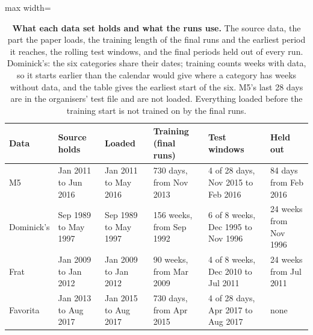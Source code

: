 \begin{table}[t]
\centering
\caption{\textbf{What each data set holds and what the runs use.} The source data, the part the paper loads, the
training length of the final runs and the earliest period it reaches, the rolling test windows, and the final periods
held out of every run. Dominick's: the six categories share their dates; training counts weeks with data, so it starts earlier than the
calendar would give where a category has weeks without data, and the table gives the earliest start of the six.
M5's last 28 days are in the organisers' test file and are not loaded. Everything loaded before the training
start is not trained on by the final runs.}
\label{tab:data-spans}
\footnotesize\setlength{\tabcolsep}{4pt}
\begin{adjustbox}{max width=\textwidth}\begin{tabular}{llllll}
\toprule
Data & Source holds & Loaded & Training (final runs) & Test windows & Held out \\
\midrule
M5 & Jan 2011 to Jun 2016 & Jan 2011 to May 2016 & 730 days, from Nov 2013 & 4 of 28 days, Nov 2015 to Feb 2016 & 84 days from Feb 2016 \\
Dominick's & Sep 1989 to May 1997 & Sep 1989 to May 1997 & 156 weeks, from Sep 1992 & 6 of 8 weeks, Dec 1995 to Nov 1996 & 24 weeks from Nov 1996 \\
Frat & Jan 2009 to Jan 2012 & Jan 2009 to Jan 2012 & 90 weeks, from Mar 2009 & 4 of 8 weeks, Dec 2010 to Jul 2011 & 24 weeks from Jul 2011 \\
Favorita & Jan 2013 to Aug 2017 & Jan 2015 to Aug 2017 & 730 days, from Apr 2015 & 4 of 28 days, Apr 2017 to Aug 2017 & none \\
\bottomrule
\end{tabular}\end{adjustbox}
\end{table}
